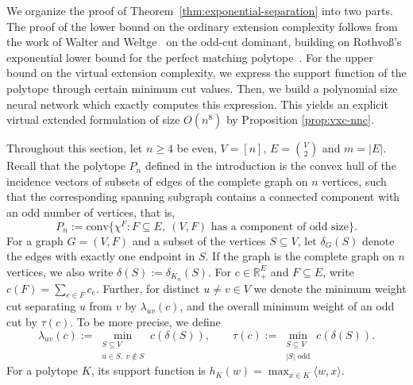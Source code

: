 \documentclass[centering,11pt,reqno]{amsart}
\theoremstyle{definition}
\newcommand{\R}{\mathbb{R}}
\newcommand{\conv}{\mathrm{conv}}
\def\R{\mathbb{R}}
\begin{document}
We organize the proof of Theorem~\ref{thm:exponential-separation} into two parts.
The proof of the lower bound on the ordinary extension complexity follows from the work of Walter and Weltge~\cite{WalterWeltgeRadialCones} on the odd-cut dominant, building on Rothvo{\ss}'s exponential lower bound for the perfect matching polytope~\cite{MatchingExtensions}.
For the upper bound on the virtual extension complexity, we express the support function of the polytope through certain minimum cut values.
Then, we build a polynomial size neural network which exactly computes this expression.
This yields an explicit virtual extended formulation of size $O(n^8)$ by Proposition \ref{prop:vxc-nnc}.

Throughout this section, let $n\ge4$ be even, $V=[n]$, $E=\binom{V}{2}$ and $m=|E|$.
Recall that the polytope $P_n$ defined in the introduction is the convex hull of the incidence vectors of subsets of edges of the complete graph on $n$ vertices, such that the corresponding spanning subgraph contains a connected component with an odd number of vertices, that is,
\[P_n:=\conv\{\chi^{F}:F\subseteq E,\ (V,F)\text{ has a component of odd size}\}.\]
For a graph $G=(V,F)$ and a subset of the vertices $S\subseteq V$, let $\delta_G(S)$ denote the edges with exactly one endpoint in $S$.
If the graph is the complete graph on $n$ vertices, we also write $\delta(S):=\delta_{K_n}(S)$.
For $c\in\R_+^E$ and $F\subseteq E$, write $c(F)=\sum_{e\in F}c_e$.
Further, for distinct $u\neq v\in V$ we denote the minimum weight cut separating $u$ from $v$ by $\lambda_{uv}(c)$, and the overall minimum weight of an odd cut by $\tau(c)$.
To be more precise, we define 
\[
    \lambda_{uv}(c):=\min_{\substack{S\subseteq V\\u\in S,\ v\notin S}}c(\delta(S)),
    \qquad
    \tau(c):=\min_{\substack{S\subseteq V\\|S|\text{ odd}}}c(\delta(S)).
\]
For a polytope $K$, its support function is $h_K(w)=\max_{x\in K}\langle w,x\rangle$.
\end{document}
